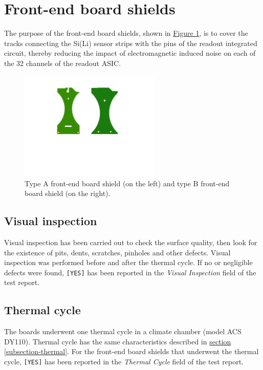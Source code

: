 
\section{Front-end board shields} \label{secShield}

The purpose of the front-end board shields, shown in \hyperref[figShieldsAB]{Figure \ref{figShieldsAB}}, is to cover the tracks connecting the Si(Li) sensor strips with the pins of the readout integrated circuit, thereby reducing the impact of electromagnetic induced noise on each of the 32 channels of the readout ASIC.

\begin{figure}[h!]
    \centering
    \includegraphics[width=0.6\textwidth]{Images/chap2/shieldsPDFtwo.pdf}
    \caption{Type A front-end board shield (on the left) and type B front-end board shield (on the right).}
    \label{figShieldsAB}
\end{figure}

\subsection{Visual inspection}
Visual inspection has been carried out to check the surface quality, then look for the existence of pits, dents, scratches, pinholes and other defects. Visual inspection was performed before and after the thermal cycle. If no or negligible defects were found, \texttt{[YES]} has been reported in the \textit{Visual Inspection} field of the test report.

\subsection{Thermal cycle}
The boards underwent one thermal cycle in a climate chamber (model ACS DY110). Thermal cycle has the same characteristics described in \hyperref[subsection-thermal]{section \ref{subsection-thermal}}. For the front-end board shields that underwent the thermal cycle, \texttt{[YES]} has been reported in the \textit{Thermal Cycle} field of the test report.

